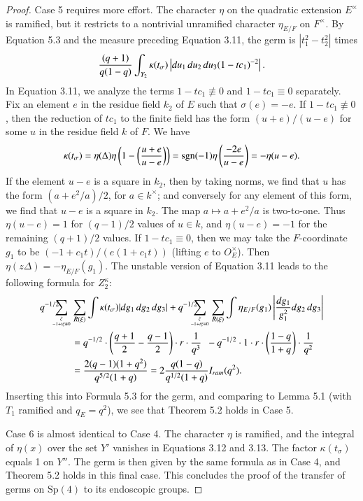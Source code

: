 \documentclass{amsart}
\begin{document}
\begin{proof}
Case 5 requires more effort.  
The character $\eta$ on the
quadratic extension $E^\times$ is ramified, but it restricts
to a nontrivial unramified character $\eta_{E/F}$ on
$F^\times$.  By Equation 5.3 and the measure preceding
Equation 3.11, the germ is $|t_1^2-t_2^2|$ times
$${(q+1)\over q(1-q)}\int_{Y_2}\kappa(t_\sigma)
 \left|du_1\,du_2\,du_3 (1-t c_1)^{-2}\right|.$$
In Equation 3.11, we analyze the terms $1-t c_1\not\equiv0$
and $1-t c_1\equiv0$ separately.
Fix an element $e$ in the residue field $k_2$ of $E$ such
that $\sigma(e) = -e$.
If $1-t c_1\not\equiv0$, then the reduction of $t c_1$ to
the finite field has the form $(u+e)/(u-e)$ for some $u$
in the residue field $k$ of $F$. We have 
$$\kappa(t_\sigma) = \eta(\Delta)\eta\left(
1-\left({u+e\over u-e}\right)\right) =
\text{sgn}(-1)\eta\left({-2e\over u-e}\right) = -\eta(u-e).$$
If the element $u-e$ is a square in $k_2$, then by taking
norms, we find that $u$ has the form $(a+ e^2/a)/2$, for $a\in k^\times$;
and conversely for any element of this form, we find that $u-e$
is a square in $k_2$. The map $a\mapsto a+ e^2/a$ is two-to-one.
Thus $\eta(u-e) = 1$ for $(q-1)/2$ values
of $u\in k$, 
and $\eta(u-e) = -1$ for the remaining $(q+1)/2$ 
values.  If $1-t c_1\equiv 0$, then we may take the
$F$-coordinate $g_1$ to be $(-1+ c_1 t)/(e (1+c_1 t))$ 
(lifting $e$ to $O_E^\times$).
Then $\eta(z\Delta) = -\eta_{E/F}(g_1)$.  The unstable
version of Equation 3.11 leads to the following formula
for $Z_2^\kappa$:
\begin{align*}
q^{-1/2}\hskip-1em\sum_{\xi\atop  -1+t\xi \not\equiv0}
&\sum_{R(\xi)} \int \kappa(t_\sigma)|dg_1\,dg_2\,dg_3| + q^{-1/2} 
\hskip-1em
\sum_{\xi\atop  -1+t\xi \equiv 0}
\sum_{R(\xi)} \int \eta_{E/F}(g_1)\left|{dg_1\over g_1^2} dg_2\,dg_3\right|\\
&= q^{-1/2}\cdot \left(
{q+1\over 2} - {q-1\over 2}\right)
\cdot r\cdot {1\over q^3} \ \ - q^{-1/2}\cdot 1\cdot r\cdot
\left( 1-q\over 1+q\right)\cdot {1\over q^2}\\
 &= {2 (q-1) (1+q^2)\over q^{5/2} (1+q)}=
   2{q(1-q)\over q^{1/2}(1+q)} I_{ram}(q^2).
\end{align*}
Inserting this into Formula 5.3 for the germ, and
comparing to Lemma 5.1 (with $T_1$ ramified and $q_E=q^2$), 
we see that Theorem 5.2 holds
in Case 5.


Case 6 is almost identical to Case 4.  The character $\eta$
is ramified, and the integral of $\eta(x)$ over the set $Y'$ vanishes
in Equations 3.12 and 3.13.  The factor $\kappa(t_\sigma)$
equals 1 on $Y''$.  The germ is then given by the same
formula as in Case 4, and Theorem 5.2 holds in this final case.
This concludes the proof of the transfer of germs on $\text{Sp}(4)$
to its endoscopic groups. \end{proof}
\end{document}
